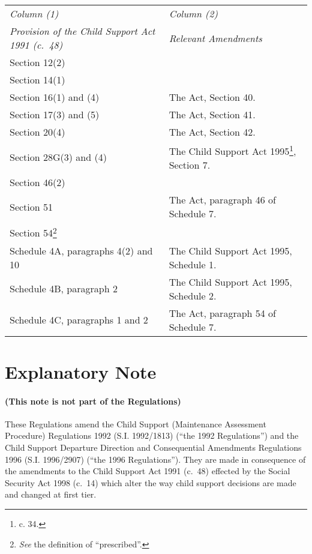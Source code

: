 \documentclass[12pt,a4paper]{article}
\begin{document}
{\footnotesize
\begin{longtable}{p{189pt}p{177pt}}
\hline
\itshape Column (1) & \itshape Column (2)\\
\itshape Provision of the Child Support Act 1991 (c.\ 48) & \itshape Relevant Amendments\\
\hline
\endhead
\hline
\endlastfoot
Section 12(2)\\
Section 14(1)\\
Section 16(1) and (4)&The Act, Section 40.\\
Section 17(3) and (5)&The Act, Section 41.\\
Section 20(4)&The Act, Section 42.\\
Section 28G(3) and (4)&The Child Support Act 1995\footnote{\frenchspacing 1995 c. 34.}, Section 7.\\
Section 46(2)\\
Section 51&The Act, paragraph 46 of Schedule 7.\\
Section 54\footnote{\frenchspacing \emph{See} the definition of “prescribed”.}\\
Schedule 4A, paragraphs 4(2) and 10&The Child Support Act 1995, Schedule 1.\\
Schedule 4B, paragraph 2&The Child Support Act 1995, Schedule 2.\\
Schedule 4C, paragraphs 1 and 2&The Act, paragraph 54 of Schedule 7.\\
\end{longtable}

}

\part{Explanatory Note}

\renewcommand\parthead{--- Explanatory Note}

\subsection*{(This note is not part of the Regulations)}

These Regulations amend the Child Support (Maintenance Assessment Procedure) Regulations 1992 (S.I. 1992/1813) (“the 1992 Regulations”) and the Child Support Departure Direction and Consequential Amendments Regulations 1996 (S.I. 1996/2907) (“the 1996 Regulations”). They are made in consequence of the amendments to the Child Support Act 1991 (c.\ 48) effected by the Social Security Act 1998 (c.\ 14) which alter the way child support decisions are made and changed at first tier.
\end{document}
